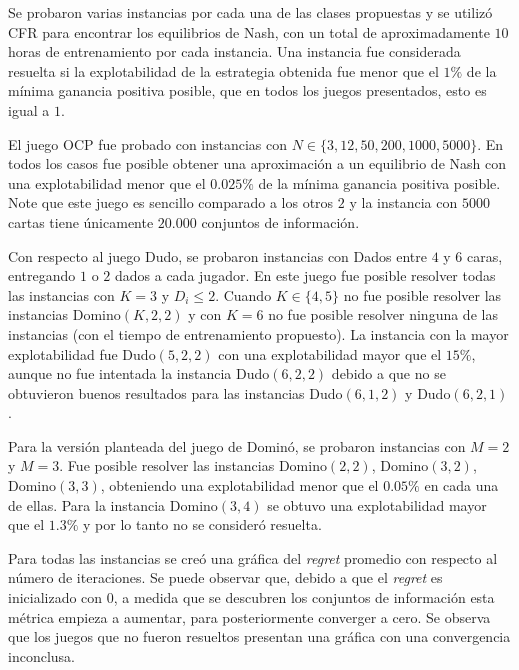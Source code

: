 Se probaron varias instancias por cada una de las clases propuestas y se utilizó CFR para encontrar los equilibrios de Nash, con un total de aproximadamente $10$ horas de entrenamiento por cada instancia. Una instancia fue considerada resuelta si la explotabilidad de la estrategia obtenida fue menor que el $1\%$ de la mínima ganancia positiva posible, que en todos los juegos presentados, esto es igual a $1$.

El juego OCP fue probado con instancias con $N \in \{ 3, 12, 50, 200, 1000, 5000\}$. En todos los casos fue posible obtener una aproximación a un equilibrio de Nash con una explotabilidad menor que el $0.025\%$ de la mínima ganancia positiva posible. Note que este juego es sencillo comparado a los otros $2$ y la instancia con $5000$ cartas tiene únicamente $20.000$ conjuntos de información.

Con respecto al juego Dudo, se probaron instancias con Dados entre $4$ y $6$ caras, entregando $1$ o $2$ dados a cada jugador. En este juego fue posible resolver todas las instancias con $K = 3$ y $D_i \leq 2$. Cuando $K \in \{4, 5\}$ no fue posible resolver las instancias Domino$(K, 2, 2)$ y con $K = 6$ no fue posible resolver ninguna de las instancias (con el tiempo de entrenamiento propuesto). La instancia con la mayor explotabilidad fue Dudo$(5, 2, 2)$ con una explotabilidad mayor que el $15\%$, aunque no fue intentada la instancia Dudo$(6, 2, 2)$ debido a que no se obtuvieron buenos resultados para las instancias Dudo$(6, 1, 2)$ y Dudo$(6, 2, 1)$.

Para la versión planteada del juego de Dominó, se probaron instancias con $M = 2$ y $M = 3$. Fue posible resolver las instancias Domino$(2, 2)$, Domino$(3, 2)$, Domino$(3, 3)$, obteniendo una explotabilidad menor que el $0.05\%$ en cada una de ellas. Para la instancia Domino$(3, 4)$ se obtuvo una explotabilidad mayor que el $1.3\%$ y por lo tanto no se consideró resuelta.

Para todas las instancias se creó una gráfica del \textit{regret} promedio con respecto al número de iteraciones. Se puede observar que, debido a que el \textit{regret} es inicializado con $0$, a medida que se descubren los conjuntos de información esta métrica empieza a aumentar, para posteriormente converger a cero. Se observa que los juegos que no fueron resueltos presentan una gráfica con una convergencia inconclusa.

